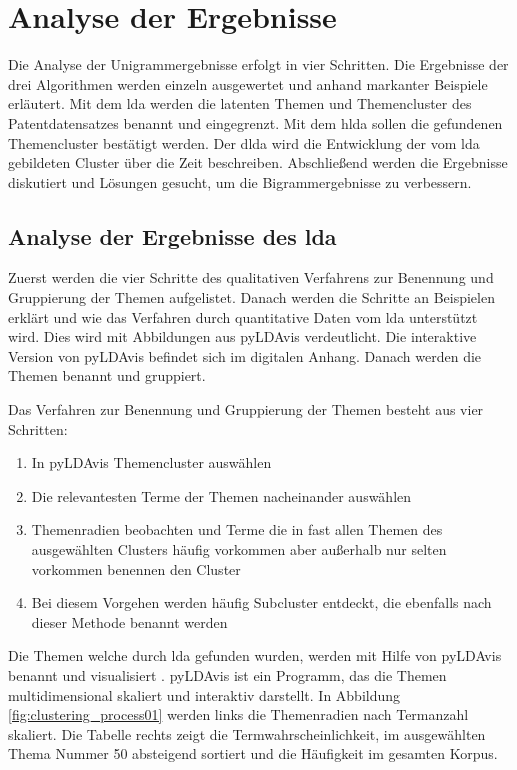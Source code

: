 \chapter{Analyse der Ergebnisse}


Die Analyse der Unigrammergebnisse erfolgt in vier Schritten. Die Ergebnisse der drei Algorithmen werden einzeln ausgewertet und anhand markanter Beispiele erläutert. Mit dem \gls{lda} werden die latenten Themen und Themencluster des Patentdatensatzes benannt und eingegrenzt. Mit dem \gls{hlda} sollen die gefundenen Themencluster bestätigt werden. Der \gls{dlda} wird die Entwicklung der vom \gls{lda} gebildeten Cluster über die Zeit beschreiben. Abschließend werden die Ergebnisse diskutiert und Lösungen gesucht, um die Bigrammergebnisse zu verbessern.


\section{Analyse der Ergebnisse des \gls{lda}} \label{lda_analysis}

Zuerst werden die vier Schritte des qualitativen Verfahrens zur Benennung und Gruppierung der Themen aufgelistet. Danach werden die Schritte an Beispielen erklärt und wie das Verfahren durch quantitative Daten vom \gls{lda} unterstützt wird. Dies wird mit Abbildungen aus \gls{pyLDAvis} verdeutlicht. Die interaktive Version von \gls{pyLDAvis} befindet sich im digitalen Anhang. Danach werden die Themen benannt und gruppiert.

Das Verfahren zur Benennung und Gruppierung der Themen besteht aus vier Schritten:
\begin{enumerate}
	\item In \gls{pyLDAvis} Themencluster auswählen
	\item Die relevantesten Terme der Themen nacheinander auswählen
	\item Themenradien beobachten und Terme die in fast allen Themen des ausgewählten Clusters häufig vorkommen aber außerhalb nur selten vorkommen benennen den Cluster
	\item Bei diesem Vorgehen werden häufig Subcluster entdeckt, die ebenfalls nach dieser Methode benannt werden
\end{enumerate}

Die Themen welche durch \gls{lda} gefunden wurden, werden mit Hilfe von \gls{pyLDAvis} benannt und visualisiert \parencite[vgl.][S. 63]{sievert2014ldavis}. \gls{pyLDAvis} ist ein Programm, das die Themen multidimensional skaliert und interaktiv darstellt. In Abbildung \ref{fig:clustering_process01} werden links die Themenradien nach Termanzahl skaliert. Die Tabelle rechts zeigt die Termwahrscheinlichkeit, im ausgewählten Thema Nummer 50 absteigend sortiert und die Häufigkeit im gesamten Korpus.

